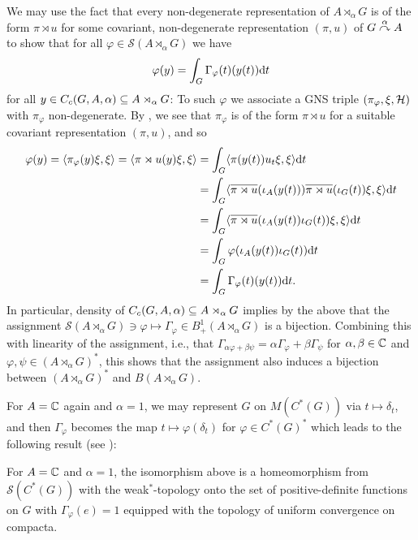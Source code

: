 \begin{remark}
We may use the fact that every non-degenerate representation of $A \rtimes_\alpha G$ is of the form $\pi \rtimes u$ for some covariant, non-degenerate representation $(\pi,u)$ of $G \stackrel{\alpha}{\curvearrowright} A$ to show that for all $\varphi \in \mathcal{S}(A \rtimes_\alpha G)$ we have
\begin{align}
	\varphi(y) = \int_G \Gamma_\varphi(t)(y(t)) \mathrm{d} t
	\label{eq:gammafun}
\end{align}
for all $y \in C_c(G,A,\alpha) \subseteq A \rtimes_\alpha G$: To such $\varphi$ we associate a GNS triple $(\pi_\varphi,\xi, \mathcal{H})$ with $\pi_{\varphi}$ non-degenerate. By , we see that $\pi_\varphi$ is of the form $\pi \rtimes u$ for a suitable covariant representation $(\pi,u)$, and so
\begin{align*}
\varphi(y) = \langle \pi_\varphi(y) \xi, \xi \rangle = \langle \pi \rtimes u(y) \xi, \xi\rangle &= \int_G \langle \pi(y(t)) u_t \xi, \xi \rangle \mathrm{d} t\\
&= \int_G \langle \overline{\pi \rtimes u }(\iota_A(y(t))) \overline{\pi \rtimes u } (\iota_G(t)) \xi , \xi \rangle \mathrm{d} t\\
&= \int_G \langle \overline{\pi \rtimes u} (\iota_A(y(t)) \iota_G(t)) \xi , \xi \rangle\mathrm{d} t\\
&= \int_G \varphi(\iota_A(y(t)) \iota_G(t)) \mathrm{d} t \\
&= \int_G \Gamma_\varphi (t) (y(t)) \mathrm{d} t.
\end{align*}
In particular, density of $C_c(G, A,\alpha) \subseteq A \rtimes_\alpha G$ implies by the above that the assignment $\mathcal{S}(A \rtimes_\alpha G) \ni \varphi \mapsto \Gamma_\varphi \in B_+^1(A \rtimes_\alpha G)$ is a bijection. Combining this with linearity of the assignment, i.e., that $\Gamma_{\alpha \varphi + \beta \psi}= \alpha \Gamma_\varphi + \beta \Gamma_\psi$ for $\alpha, \beta \in \mathbb{C}$ and $\varphi, \psi \in (A \rtimes_\alpha G)^*$, this shows that the assignment also induces a bijection between $(A \rtimes_\alpha G )^*$ and $B(A \rtimes_\alpha G)$.
\end{remark}
For $A = \mathbb{C}$ again and $\alpha = 1$, we may represent $G$ on $M(C^*(G))$ via $t \mapsto \delta_t$, and then $\Gamma_\varphi$ becomes the map $t \mapsto \varphi(\delta_t)$ for $ \varphi \in C^*(G)^*$ which leads to the following result (see \cite[7.1.11]{pedersenalgauto}):
\begin{proposition}
For $A= \mathbb{C}$ and $\alpha = 1$, the isomorphism above is a homeomorphism from $\mathcal{S}(C^*(G))$ with the weak$^*$-topology onto the set of positive-definite functions on $G$ with $\Gamma_\varphi(e)=1$ equipped with the topology of uniform convergence on compacta.
\label{mult:OGstatehomeo}
\end{proposition}

